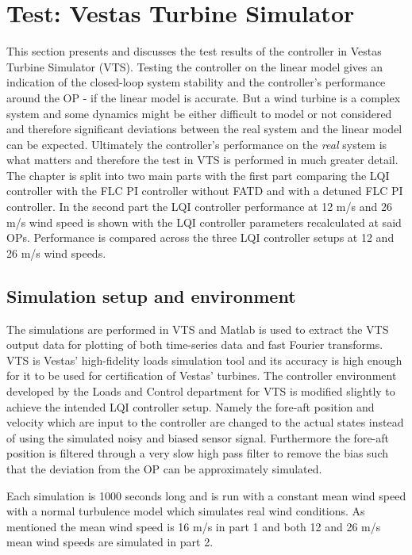\section{Test: Vestas Turbine Simulator} \label{sec:test_vts}
This section presents and discusses the test results of the controller in Vestas Turbine Simulator (VTS). Testing the controller on the linear model gives an indication of the closed-loop system stability and the controller's performance around the OP - if the linear model is accurate. But a wind turbine is a complex system and some dynamics might be either difficult to model or not considered and therefore significant deviations between the real system and the linear model can be expected. Ultimately the controller's performance on the \textit{real} system is what matters and therefore the test in VTS is performed in much greater detail. The chapter is split into two main parts with the first part comparing the LQI controller with the FLC PI controller without FATD and with a detuned FLC PI controller. In the second part the LQI controller performance at 12 m/s and 26 m/s wind speed is shown with the LQI controller parameters recalculated at said OPs. Performance is compared across the three LQI controller setups at 12 and 26 m/s wind speeds.

\subsection{Simulation setup and environment}
The simulations are performed in VTS and Matlab is used to extract the VTS output data for plotting of both time-series data and fast Fourier transforms. VTS is Vestas' high-fidelity loads simulation tool and its accuracy is high enough for it to be used for certification of Vestas' turbines. The controller environment developed by the Loads and Control department for VTS is modified slightly to achieve the intended LQI controller setup. Namely the fore-aft position and velocity which are input to the controller are changed to the actual states instead of using the simulated noisy and biased sensor signal. Furthermore the fore-aft position is filtered through a very slow high pass filter to remove the bias such that the deviation from the OP can be approximately simulated.

\smallskip
Each simulation is 1000 seconds long and is run with a constant mean wind speed with a normal turbulence model which simulates real wind conditions. As mentioned the mean wind speed is 16 m/s in part 1 and both 12 and 26 m/s mean wind speeds are simulated in part 2.

